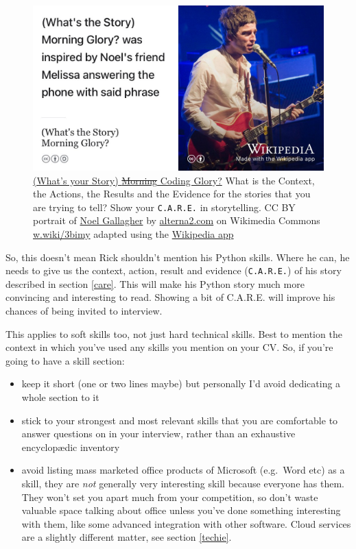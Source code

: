 \documentclass[
]{book}
\providecommand{\tightlist}{%
  \setlength{\itemsep}{0pt}\setlength{\parskip}{0pt}}
\begin{document}
\begin{figure}

{\centering \includegraphics[width=1\linewidth]{images/whats-the-story} 

}

\caption{\href{https://en.wikipedia.org/wiki/(What\%27s_the_Story)_Morning_Glory\%3F}{(What's your Story) \sout{Morning} Coding Glory?} What is the Context, the Actions, the Results and the Evidence for the stories that you are trying to tell? Show your \texttt{C.A.R.E.} in storytelling. CC BY portrait of \href{https://en.wikipedia.org/wiki/Noel_Gallagher}{Noel Gallagher} by \href{https://alterna2.com/}{alterna2.com} on Wikimedia Commons \href{https://w.wiki/3bim}{w.wiki/3bimy} adapted using the \href{https://apps.apple.com/us/app/wikipedia/id324715238}{Wikipedia app}}\label{fig:gallagher-fig}
\end{figure}



So, this doesn't mean Rick shouldn't mention his Python skills. Where he can, he needs to give us the context, action, result and evidence (\texttt{C.A.R.E.}) of his story described in section \ref{care}. This will make his Python story much more convincing and interesting to read. Showing a bit of C.A.R.E. will improve his chances of being invited to interview.

This applies to soft skills too, not just hard technical skills. Best to mention the context in which you've used any skills you mention on your CV. So, if you're going to have a skill section:

\begin{itemize}
\tightlist
\item
  keep it short (one or two lines maybe) but personally I'd avoid dedicating a whole section to it
\item
  stick to your strongest and most relevant skills that you are comfortable to answer questions on in your interview, rather than an exhaustive encyclopædic inventory
\item
  avoid listing mass marketed office products of Microsoft (e.g.~Word etc) as a skill, they are \emph{not} generally very interesting skill because everyone has them. They won't set you apart much from your competition, so don't waste valuable space talking about office unless you've done something interesting with them, like some advanced integration with other software. Cloud services are a slightly different matter, see section \ref{techie}.
\end{itemize}
\end{document}
